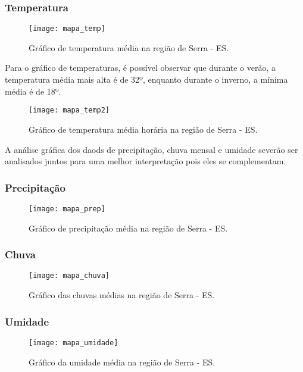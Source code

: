 \subsubsection{Temperatura}

\begin{figure}[!ht]
	\texttt{[image: mapa\_temp]}
	\centering
	\caption{Gráfico de temperatura média na região de Serra - ES.}
\end{figure}

Para o gráfico de temperaturas, é possível observar que durante o verão, a temperatura média mais alta é de 32º, enquanto durante o inverno, a mínima média é de 18º. 

\begin{figure}[!ht]
	\texttt{[image: mapa\_temp2]}
	\centering
	\caption{Gráfico de temperatura média horária na região de Serra - ES.}
\end{figure}

A análise gráfica dos daods de precipitação, chuva mensal e umidade severão ser analisados juntos para uma melhor interpretação pois eles se complementam.

\subsubsection{Precipitação}

\begin{figure}[!ht]
	\texttt{[image: mapa\_prep]}
	\centering
	\caption{Gráfico de precipitação média na região de Serra - ES.}
	\label{mapa_prep}
\end{figure}

\subsubsection{Chuva}
\begin{figure}[!ht]
	\texttt{[image: mapa\_chuva]}
	\centering
	\caption{Gráfico das chuvas médias na região de Serra - ES.}
	\label{mapa_chuva}
\end{figure}
\subsubsection{Umidade}
\begin{figure}[!ht]
	\texttt{[image: mapa\_umidade]}
	\centering
	\caption{Gráfico da umidade média na região de Serra - ES.}
	\label{mapa_umidade}
\end{figure}

